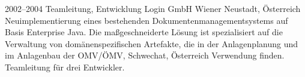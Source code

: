 \cventry
{2002--2004}
{Teamleitung, Entwicklung}
{}
{Login GmbH}
{Wiener Neustadt, Österreich}
{
  Neuimplementierung eines bestehenden Dokumentenmanagementsystems auf Basis
  Enterprise Java. Die maßgeschneiderte Lösung ist spezialisiert auf die Verwaltung
  von domänenspezifischen Artefakte, die in der Anlagenplanung und im Anlagenbau der
  OMV/ÖMV, Schwechat, Österreich Verwendung finden. Teamleitung für drei Entwickler.
}
